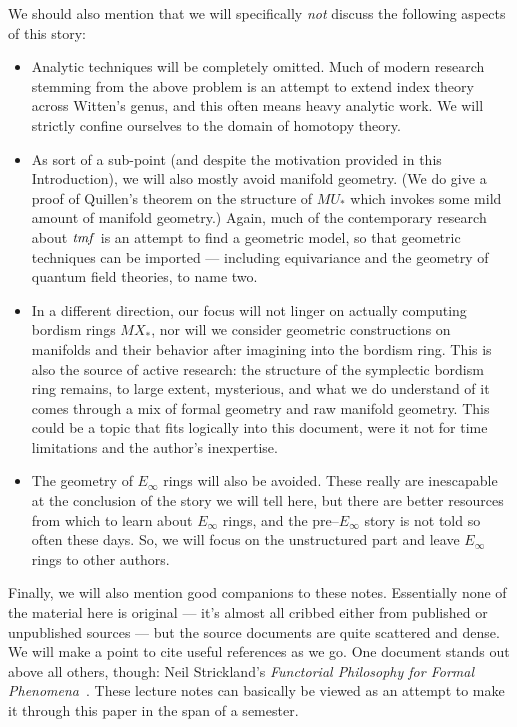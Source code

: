 We should also mention that we will specifically \emph{not} discuss the following aspects of this story:
\begin{itemize}
\item Analytic techniques will be completely omitted.  Much of modern research stemming from the above problem is an attempt to extend index theory across Witten's genus, and this often means heavy analytic work.  We will strictly confine ourselves to the domain of homotopy theory.
\item As sort of a sub-point (and despite the motivation provided in this Introduction), we will also mostly avoid manifold geometry.  (We do give a proof of Quillen's theorem on the structure of $MU_*$ which invokes some mild amount of manifold geometry.)  Again, much of the contemporary research about $\mathit{tmf}$ is an attempt to find a geometric model, so that geometric techniques can be imported --- including equivariance and the geometry of quantum field theories, to name two.
\item In a different direction, our focus will not linger on actually computing bordism rings $MX_*$, nor will we consider geometric constructions on manifolds and their behavior after imagining into the bordism ring.  This is also the source of active research: the structure of the symplectic bordism ring remains, to large extent, mysterious, and what we do understand of it comes through a mix of formal geometry and raw manifold geometry.  This could be a topic that fits logically into this document, were it not for time limitations and the author's inexpertise.
\item The geometry of $E_\infty$ rings will also be avoided.  These really are inescapable at the conclusion of the story we will tell here, but there are better resources from which to learn about $E_\infty$ rings, and the pre--$E_\infty$ story is not told so often these days.  So, we will focus on the unstructured part and leave $E_\infty$ rings to other authors.
\end{itemize}

Finally, we will also mention good companions to these notes.  Essentially none of the material here is original --- it's almost all cribbed either from published or unpublished sources --- but the source documents are quite scattered and dense.  We will make a point to cite useful references as we go.  One document stands out above all others, though: Neil Strickland's \textit{Functorial Philosophy for Formal Phenomena}~\cite{StricklandFPFP}.  These lecture notes can basically be viewed as an attempt to make it through this paper in the span of a semester.

